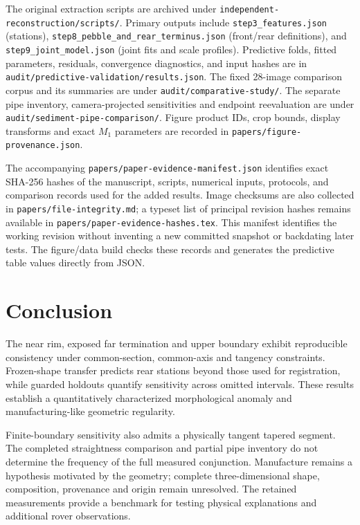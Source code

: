 \documentclass[11pt,letterpaper]{article}
\newcommand{\sourcepath}[1]{\nolinkurl{#1}}
\begin{document}
The original extraction scripts are archived under \sourcepath{independent-reconstruction/scripts/}. Primary outputs include \sourcepath{step3_features.json} (stations), \sourcepath{step8_pebble_and_rear_terminus.json} (front/rear definitions), and \sourcepath{step9_joint_model.json} (joint fits and scale profiles). Predictive folds, fitted parameters, residuals, convergence diagnostics, and input hashes are in \sourcepath{audit/predictive-validation/results.json}. The fixed 28-image comparison corpus and its summaries are under \sourcepath{audit/comparative-study/}. The separate pipe inventory, camera-projected sensitivities and endpoint reevaluation are under \sourcepath{audit/sediment-pipe-comparison/}. Figure product IDs, crop bounds, display transforms and exact $M_1$ parameters are recorded in \sourcepath{papers/figure-provenance.json}.

The accompanying \sourcepath{papers/paper-evidence-manifest.json} identifies exact SHA-256 hashes of the manuscript, scripts, numerical inputs, protocols, and comparison records used for the added results. Image checksums are also collected in \sourcepath{papers/file-integrity.md}; a typeset list of principal revision hashes remains available in \sourcepath{papers/paper-evidence-hashes.tex}. This manifest identifies the working revision without inventing a new committed snapshot or backdating later tests. The figure/data build checks these records and generates the predictive table values directly from JSON.


\section{Conclusion}

The near rim, exposed far termination and upper boundary exhibit reproducible consistency under common-section, common-axis and tangency constraints. Frozen-shape transfer predicts rear stations beyond those used for registration, while guarded holdouts quantify sensitivity across omitted intervals. These results establish a quantitatively characterized morphological anomaly and manufacturing-like geometric regularity.

Finite-boundary sensitivity also admits a physically tangent tapered segment. The completed straightness comparison and partial pipe inventory do not determine the frequency of the full measured conjunction. Manufacture remains a hypothesis motivated by the geometry; complete three-dimensional shape, composition, provenance and origin remain unresolved. The retained measurements provide a benchmark for testing physical explanations and additional rover observations.
\end{document}
